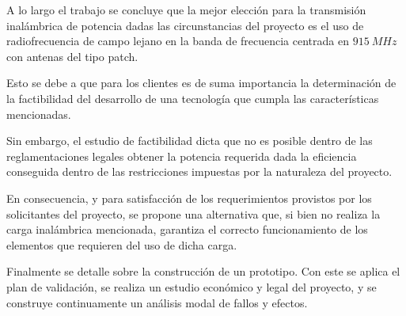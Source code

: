 A lo largo el trabajo se concluye que la mejor elección para la transmisión inalámbrica de potencia dadas las circunstancias del proyecto es el uso de radiofrecuencia de campo lejano en la banda de frecuencia centrada en $915 \ MHz$ con antenas del tipo patch.

Esto se debe a que para los clientes es de suma importancia la determinación de la factibilidad del desarrollo de una tecnología que cumpla las características mencionadas.

Sin embargo, el estudio de factibilidad dicta que no es posible dentro de las reglamentaciones legales obtener la potencia requerida dada la eficiencia conseguida dentro de las restricciones impuestas por la naturaleza del proyecto.

En consecuencia, y para satisfacción de los requerimientos provistos por los solicitantes del proyecto, se propone una alternativa que, si bien no realiza la carga inalámbrica mencionada, garantiza el correcto funcionamiento de los elementos que requieren del uso de dicha carga.


Finalmente se detalle sobre la construcción de un prototipo. Con este se aplica el plan de validación, se realiza un estudio económico y legal del proyecto, y se construye continuamente un análisis modal de fallos y efectos.

%